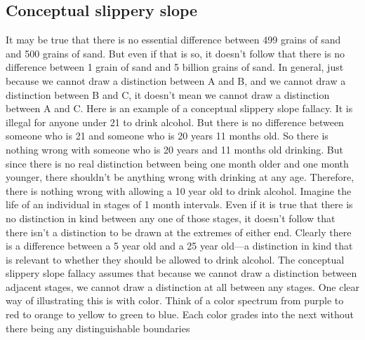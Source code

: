 \subsection{Conceptual slippery slope}
It may be true that there is no essential difference between 499 grains of sand
and 500 grains of sand. But even if that is so, it doesn't follow that there is no
difference between 1 grain of sand and 5 billion grains of sand. In general, just
because we cannot draw a distinction between A and B, and we cannot draw a
distinction between B and C, it doesn't mean we cannot draw a distinction
between A and C. Here is an example of a conceptual slippery slope fallacy.
It is illegal for anyone under 21 to drink alcohol. But there is no
difference between someone who is 21 and someone who is 20 years 11
months old. So there is nothing wrong with someone who is 20 years and
11 months old drinking. But since there is no real distinction between
being one month older and one month younger, there shouldn't be
anything wrong with drinking at any age. Therefore, there is nothing
wrong with allowing a 10 year old to drink alcohol.
Imagine the life of an individual in stages of 1 month intervals. Even if it is true
that there is no distinction in kind between any one of those stages, it doesn't
follow that there isn't a distinction to be drawn at the extremes of either end.
Clearly there is a difference between a 5 year old and a 25 year old—a
distinction in kind that is relevant to whether they should be allowed to drink
alcohol. The conceptual slippery slope fallacy assumes that because we cannot
draw a distinction between adjacent stages, we cannot draw a distinction at all
between any stages. One clear way of illustrating this is with color. Think of a
color spectrum from purple to red to orange to yellow to green to blue. Each
color grades into the next without there being any distinguishable boundaries

